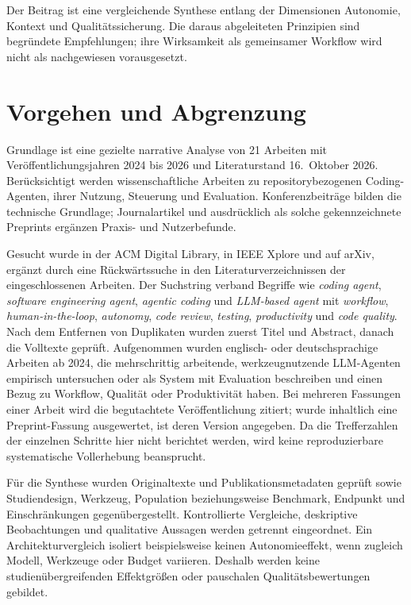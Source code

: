 \documentclass[conference]{IEEEtran}
\begin{document}
Der Beitrag ist eine vergleichende Synthese entlang der Dimensionen Autonomie, Kontext und Qualitätssicherung. Die daraus abgeleiteten Prinzipien sind begründete Empfehlungen; ihre Wirksamkeit als gemeinsamer Workflow wird nicht als nachgewiesen vorausgesetzt.

\section{Vorgehen und Abgrenzung}
Grundlage ist eine gezielte narrative Analyse von 21 Arbeiten mit Veröffentlichungsjahren 2024 bis 2026 und Literaturstand 16.~Oktober 2026. Berücksichtigt werden wissenschaftliche Arbeiten zu repositorybezogenen Coding-Agenten, ihrer Nutzung, Steuerung und Evaluation. Konferenzbeiträge bilden die technische Grundlage; Journalartikel und ausdrücklich als solche gekennzeichnete Preprints ergänzen Praxis- und Nutzerbefunde.

Gesucht wurde in der ACM Digital Library, in IEEE Xplore und auf arXiv, ergänzt durch eine Rückwärtssuche in den Literaturverzeichnissen der eingeschlossenen Arbeiten. Der Suchstring verband Begriffe wie \emph{coding agent}, \emph{software engineering agent}, \emph{agentic coding} und \emph{LLM-based agent} mit \emph{workflow}, \emph{human-in-the-loop}, \emph{autonomy}, \emph{code review}, \emph{testing}, \emph{productivity} und \emph{code quality}. Nach dem Entfernen von Duplikaten wurden zuerst Titel und Abstract, danach die Volltexte geprüft. Aufgenommen wurden englisch- oder deutschsprachige Arbeiten ab 2024, die mehrschrittig arbeitende, werkzeugnutzende LLM-Agenten empirisch untersuchen oder als System mit Evaluation beschreiben und einen Bezug zu Workflow, Qualität oder Produktivität haben. Bei mehreren Fassungen einer Arbeit wird die begutachtete Veröffentlichung zitiert; wurde inhaltlich eine Preprint-Fassung ausgewertet, ist deren Version angegeben. Da die Trefferzahlen der einzelnen Schritte hier nicht berichtet werden, wird keine reproduzierbare systematische Vollerhebung beansprucht.

Für die Synthese wurden Originaltexte und Publikationsmetadaten geprüft sowie Studiendesign, Werkzeug, Population beziehungsweise Benchmark, Endpunkt und Einschränkungen gegenübergestellt. Kontrollierte Vergleiche, deskriptive Beobachtungen und qualitative Aussagen werden getrennt eingeordnet. Ein Architekturvergleich isoliert beispielsweise keinen Autonomieeffekt, wenn zugleich Modell, Werkzeuge oder Budget variieren. Deshalb werden keine studienübergreifenden Effektgrößen oder pauschalen Qualitätsbewertungen gebildet.
\end{document}
